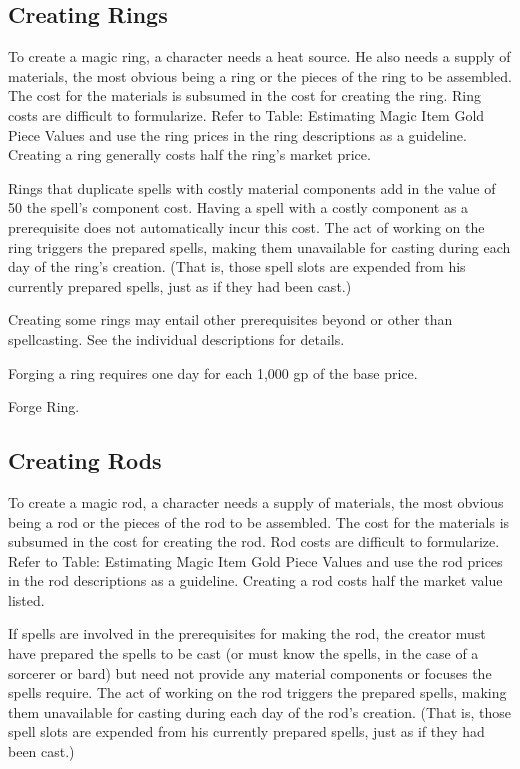 \subsection{Creating Rings}

To create a magic ring, a character needs a heat source. He also needs a supply of materials, the most obvious being a ring or the pieces of the ring to be assembled. The cost for the materials is subsumed in the cost for creating the ring. Ring costs are difficult to formularize. Refer to Table: Estimating Magic Item Gold Piece Values and use the ring prices in the ring descriptions as a guideline. Creating a ring generally costs half the ring's market price.

Rings that duplicate spells with costly material components add in the value of 50 \mtimes the spell's component cost. Having a spell with a costly component as a prerequisite does not automatically incur this cost. The act of working on the ring triggers the prepared spells, making them unavailable for casting during each day of the ring's creation. (That is, those spell slots are expended from his currently prepared spells, just as if they had been cast.)

Creating some rings may entail other prerequisites beyond or other than spellcasting. See the individual descriptions for details.

Forging a ring requires one day for each 1,000 gp of the base price.

 Forge Ring.

\subsection{Creating Rods}

To create a magic rod, a character needs a supply of materials, the most obvious being a rod or the pieces of the rod to be assembled. The cost for the materials is subsumed in the cost for creating the rod. Rod costs are difficult to formularize. Refer to Table: Estimating Magic Item Gold Piece Values and use the rod prices in the rod descriptions as a guideline. Creating a rod costs half the market value listed.

If spells are involved in the prerequisites for making the rod, the creator must have prepared the spells to be cast (or must know the spells, in the case of a sorcerer or bard) but need not provide any material components or focuses the spells require. The act of working on the rod triggers the prepared spells, making them unavailable for casting during each day of the rod's creation. (That is, those spell slots are expended from his currently prepared spells, just as if they had been cast.)

